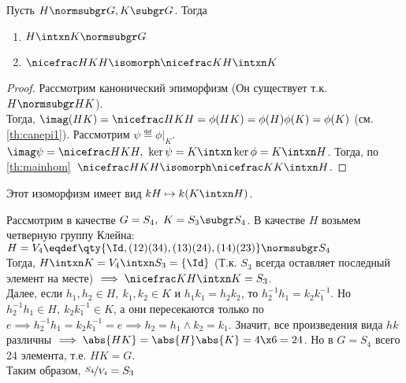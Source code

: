 \begin{theorem}
  Пусть $H\normsubgr G, K\subgr G$. Тогда
  \begin{enumerate}
    \item $H\intxn K\normsubgr G$
    \item $\factorgr{HK}{H}\isomorph \factorgr{K}{H\intxn K}$
  \end{enumerate}
\end{theorem}
\begin{proof}
  Рассмотрим канонический эпиморфизм  (Он существует т.\:к. $H\normsubgr HK$).\\
  Тогда, $\imag(HK)=\factorgr{HK}{H}=\phi(HK)=\phi(H)\phi(K)=\phi(K)$ (см. \ref{th:canepi1}). Рассмотрим $\psi\eqdef \phi|_K$. $\imag\psi=\factorgr{HK}{H},\ \ker\psi=K\intxn\ker\phi=K\intxn H$. Тогда, по \ref{th:mainhom}\ $\factorgr{HK}{H}\isomorph \factorgr{K}{K\intxn H}$.
\end{proof}
\begin{remark}
  Этот изоморфизм имеет вид $kH\mapsto k(K\intxn H)$.
\end{remark}

\begin{example}
  Рассмотрим в качестве $G=S_4,\ K=S_3\subgr S_4$. В качестве $H$ возьмем четверную группу Клейна: $H=V_4\eqdef\qty{\Id, (1 2)(3 4), (1 3)(2 4), (1 4)(2 3)}\normsubgr S_4$\\
  Тогда, $H\intxn K= V_4\intxn S_3=\{\Id\}$ (Т.\:к. $S_3$ всегда оставляет последный элемент на месте) $\implies\factorgr{K}{H\intxn K}=S_3$.\\
  Далее, если $h_1,h_2\in H,\ k_1,k_2\in K$ и $h_1k_1=h_2k_2$, то $h_2^{-1} h_1=k_2k_1^{-1}$. Но $h_2^{-1} h_1\in H,\ k_2k_1^{-1}\in K$, а они пересекаются только по $e\implies h_2^{-1} h_1=k_2k_1^{-1}=e\implies h_2=h_1 \land k_2=k_1$. Значит, все произведения вида $hk$ различны $\implies \abs{HK}=\abs{H}\abs{K}=4\x6=24$. Но в $G=S_4$ всего 24 элемента, т.\:е. $HK=G$.\\
  Таким образом, $\factorgr{S_4}{V_4}=S_3$
\end{example}

